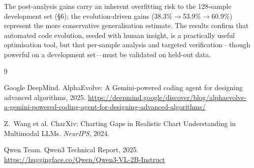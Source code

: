 \documentclass{article}
\begin{document}
The post-analysis gains carry an inherent overfitting risk to the 128-sample
development set (\S6); the evolution-driven gains
(38.3\%$\to$53.9\%$\to$60.9\%) represent the more conservative generalisation
estimate. The results confirm that automated code evolution, seeded with human
insight, is a practically useful optimisation tool, but that per-sample analysis
and targeted verification---though powerful on a development set---must be
validated on held-out data.


\begin{thebibliography}{9}

Google DeepMind.
\newblock AlphaEvolve: A Gemini-powered coding agent for designing advanced
algorithms, 2025.
\newblock \url{https://deepmind.google/discover/blog/alphaevolve-a-gemini-powered-coding-agent-for-designing-advanced-algorithms/}

Z.~Wang et al.
\newblock CharXiv: Charting Gaps in Realistic Chart Understanding in Multimodal
LLMs.
\newblock \textit{NeurIPS}, 2024.

Qwen Team.
\newblock Qwen3 Technical Report, 2025.
\newblock \url{https://huggingface.co/Qwen/Qwen3-VL-2B-Instruct}

\end{thebibliography}
\end{document}
